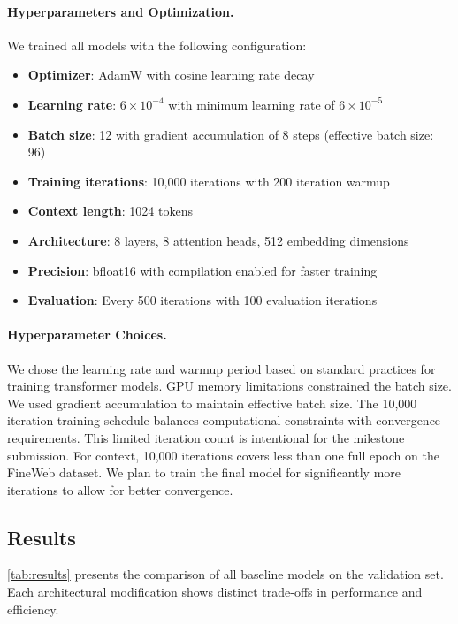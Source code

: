 \documentclass{article}
\begin{document}
\paragraph{Hyperparameters and Optimization.} We trained all models with the following configuration:
\begin{itemize}
    \item \textbf{Optimizer}: AdamW with cosine learning rate decay
    \item \textbf{Learning rate}: $6 \times 10^{-4}$ with minimum learning rate of $6 \times 10^{-5}$
    \item \textbf{Batch size}: 12 with gradient accumulation of 8 steps (effective batch size: 96)
    \item \textbf{Training iterations}: 10,000 iterations with 200 iteration warmup
    \item \textbf{Context length}: 1024 tokens
    \item \textbf{Architecture}: 8 layers, 8 attention heads, 512 embedding dimensions
    \item \textbf{Precision}: bfloat16 with compilation enabled for faster training
    \item \textbf{Evaluation}: Every 500 iterations with 100 evaluation iterations
\end{itemize}

\paragraph{Hyperparameter Choices.} We chose the learning rate and warmup period based on standard practices for training transformer models. GPU memory limitations constrained the batch size. We used gradient accumulation to maintain effective batch size. The 10,000 iteration training schedule balances computational constraints with convergence requirements. This limited iteration count is intentional for the milestone submission. For context, 10,000 iterations covers less than one full epoch on the FineWeb dataset. We plan to train the final model for significantly more iterations to allow for better convergence.

\subsection{Results}
\label{sec:results}
\cref{tab:results} presents the comparison of all baseline models on the validation set. Each architectural modification shows distinct trade-offs in performance and efficiency.
\end{document}
